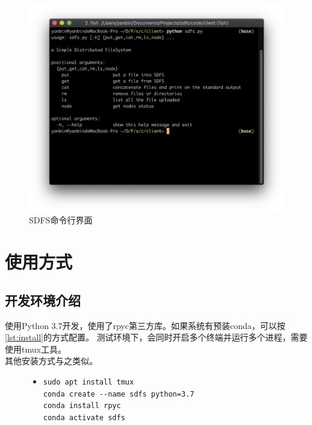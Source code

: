 \documentclass[a4paper]{article}
\begin{document}
\begin{figure}[!hbt]
    \begin{center}
    \includegraphics[scale=0.5]{assets/intro.png}
    \caption{SDFS命令行界面\label{fig:intro}} 
    \end{center} 
\end{figure} 

\section{使用方式}
\subsection{开发环境介绍}
使用Python 3.7开发，使用了rpyc第三方库。如果系统有预装conda，可以按\autoref{lst:install}的方式配置。
测试环境下，会同时开启多个终端并运行多个进程，需要使用tmux工具。\\

其他安装方式与之类似。\\

\begin{figure}[!hbt]
\begin{itemize}
\item[] \begin{lstlisting}[style=mybash, label=lst:install, caption=环境安装方式]
sudo apt install tmux
conda create --name sdfs python=3.7
conda install rpyc
conda activate sdfs
\end{lstlisting}
\end{itemize}
\end{figure}
\end{document}
